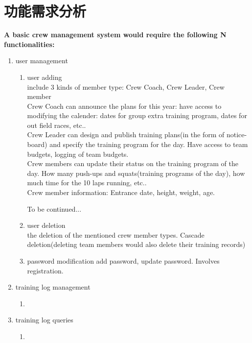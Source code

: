 \section{功能需求分析}
\textbf{A basic crew management system would require the following N functionalities:}
\begin{enumerate}
\item
  {user management
    \begin{enumerate}
    \item{user adding\\
        include 3 kinds of member type: Crew Coach, Crew Leader, Crew member\\
        
        Crew Coach can announce the plans for this year: have access to
        modifying the calender: dates for group extra training program, dates for out
        field races, etc..\\
        
        Crew Leader can design and publish training plans(in the form of
        notice-board) and specify the training program for the day. Have access
        to team budgets, logging of team budgets.\\
        
        Crew members can update their status on the training program of the day.
        How many push-ups and squats(training programs of the day), how much time
        for the 10 laps running, etc..\\

        Crew member information: Entrance date, height, weight, age.
        
        To be continued...
        }
      \item{user deletion\\
          the deletion of the mentioned crew member types. Cascade deletion(deleting
          team members would also delete their training records)
        }
      \item{password modification
          add password, update password. Involves registration.\\
        }
    \end{enumerate}
  }
\item {
    training log management
    \begin{enumerate}
      \item{}
    \end{enumerate}
  }
  
\item{
    training log queries
    \begin{enumerate}
      \item{}
    \end{enumerate}
  }
  
\end{enumerate}
